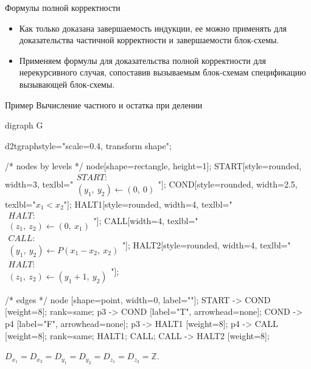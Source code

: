 \documentclass[hyperref={unicode=true}]{beamer}
\begin{document}
    \begin{frame}{Формулы полной корректности}
    \begin{itemize}
    \item Как только доказана завершаемость индукции, ее можно применять
    для доказательства частичной корректности и завершаемости блок-схемы.
    \item Применяем формулы для доказательства полной корректности
        для нерекурсивного случая, сопоставив вызываемым блок-схемам
        спецификацию вызывающей блок-схемы.
    \end{itemize}
    \end{frame}

    \begin{frame}[fragile]{Пример}
    Вычисление частного и остатка при делении
	\huge
	\begin{dot2tex}[options=-traw]
	digraph G{
		d2tgraphstyle="scale=0.4, transform shape";

		/* nodes by levels */
		node[shape=rectangle, height=1];
		START[style=rounded, width=3, texlbl="$\begin{matrix}START:\\(y_1,~y_2) \leftarrow (0,~0)\end{matrix}$"];
        COND[style=rounded, width=2.5, texlbl="$x_1 < x_2$"];
		HALT1[style=rounded, width=4, texlbl="$\begin{matrix}HALT:\\(z_1,~z_2) \leftarrow (0,~x_1)\end{matrix}$"];
		CALL[width=4, texlbl="$\begin{matrix}CALL:\\(y_1,~y_2) \leftarrow P(x_1-x_2,~x_2)\end{matrix}$"];
        HALT2[style=rounded, width=4, texlbl="$\begin{matrix}HALT:\\(z_1,~z_2) \leftarrow (y_1+1,~y_2)\end{matrix}$"];

		/* edges */
		node [shape=point, width=0, label=""];
		START -> COND [weight=8];
		{ rank=same; p3 -> COND [label="T", arrowhead=none]; COND -> p4 [label="F", arrowhead=none]; }
		p3 -> HALT1 [weight=8];
		p4 -> CALL [weight=8];
		{ rank=same; HALT1; CALL; }
		CALL -> HALT2 [weight=8];
        }
	\end{dot2tex}

	\normalsize

    $D_{x_1} = D_{x_2} = D_{y_1} = D_{y_2} = D_{z_1} = D_{z_2} = \mathbb{Z}$.
	    \end{frame}
\end{document}
